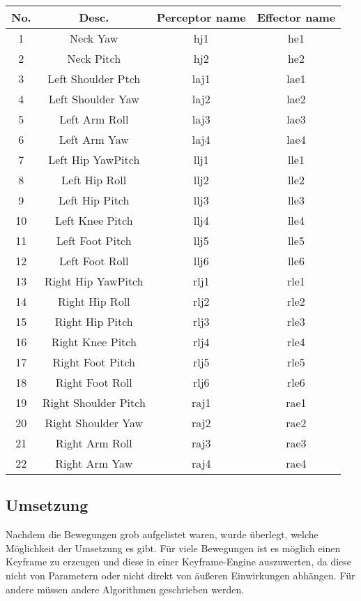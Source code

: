 \begin{tabular}{|c|c|c|c|}
\hline 
No. & Desc. &  Perceptor name & Effector name \\ 
\hline 
1 & Neck Yaw & hj1 & he1 \\ 
\hline 
2 & Neck Pitch & hj2 & he2 \\ 
\hline 
3 & Left Shoulder Ptch & laj1 & lae1 \\ 
\hline 
4 & Left Shoulder Yaw & laj2 & lae2\\ 
\hline 
5 & Left Arm Roll & laj3 & lae3 \\ 
\hline 
6 & Left Arm Yaw & laj4 & lae4 \\ 
\hline 
7 & Left Hip YawPitch & llj1 & lle1 \\ 
\hline 
8 & Left Hip Roll & llj2 & lle2 \\ 
\hline 
9 & Left Hip Pitch & llj3 & lle3 \\ 
\hline 
10 & Left Knee Pitch & llj4 & lle4 \\ 
\hline 
11 & Left Foot Pitch & llj5 & lle5 \\ 
\hline 
12 & Left Foot Roll & llj6 & lle6 \\ 
\hline 
13 & Right Hip YawPitch & rlj1 & rle1 \\ 
\hline 
14 & Right Hip Roll & rlj2 & rle2 \\ 
\hline 
15 & Right Hip Pitch & rlj3 & rle3 \\ 
\hline 
16 & Right Knee Pitch & rlj4 & rle4 \\ 
\hline 
17 & Right Foot Pitch & rlj5 & rle5 \\ 
\hline 
18 & Right Foot Roll & rlj6 & rle6 \\ 
\hline 
19 & Right Shoulder Pitch & raj1 & rae1 \\ 
\hline 
20 & Right Shoulder Yaw & raj2 & rae2 \\ 
\hline 
21 & Right Arm Roll & raj3 & rae3 \\ 
\hline 
22 & Right Arm Yaw & raj4 & rae4 \\ 
\hline 
\end{tabular} 

\subsection*{Umsetzung}
Nachdem die Bewegungen grob aufgelistet waren, wurde überlegt, welche
 Möglichkeit der Umsetzung es gibt. Für viele Bewegungen ist es möglich 
einen Keyframe zu erzeugen und diese in einer Keyframe-Engine 
auszuwerten, da diese nicht von Parametern oder nicht direkt von äußeren
 Einwirkungen abhängen. Für andere müssen andere Algorithmen geschrieben
 werden.

